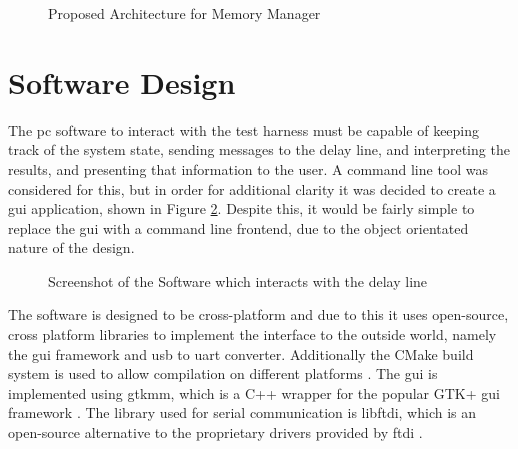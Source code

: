 \begin{figure}[ht]
	\caption{Proposed Architecture for Memory Manager}
	\label{fig:mem-manager-arch}
\end{figure}

\section{Software Design}  \label{sec:test-harness-sw}

The \gls{pc} software to interact with the test harness must be capable of keeping track of the system state, sending messages to the delay line, and interpreting the results, and presenting that information to the user. A command line tool was considered for this, but in order for additional clarity it was decided to create a \gls{gui} application, shown in Figure \ref{fig:mem-gui-screenshot}. Despite this, it would be fairly simple to replace the \gls{gui} with a command line frontend, due to the object orientated nature of the design.

\begin{figure}[ht]
	\centering
	\caption{Screenshot of the Software which interacts with the delay line}
	\label{fig:mem-gui-screenshot}
\end{figure}

The software is designed to be cross-platform and due to this it uses open-source, cross platform libraries to implement the interface to the outside world, namely the \gls{gui} framework and \gls{usb} to \gls{uart} converter. Additionally the CMake build system is used to allow compilation on different platforms \cite{cmake2017}. The \gls{gui} is implemented using gtkmm, which is a C++ wrapper for the popular GTK+ \gls{gui} framework \cite{cumming2017}. The library used for serial communication is libftdi, which is an open-source alternative to the proprietary drivers provided by \gls{ftdi} \cite{intra2net2017}.

